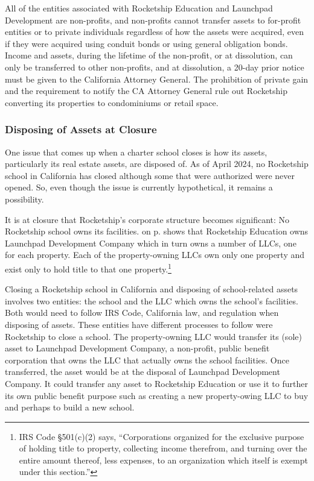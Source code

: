 All of the entities associated with Rocketship Education and Launchpad Development are non-profits, and non-profits cannot transfer assets to for-profit entities or to private individuals regardless of how the assets were acquired, even if they were acquired using conduit bonds or using general obligation bonds. Income and assets, during the lifetime of the non-profit, or at dissolution, can only be transferred to other non-profits, and at dissolution, a 20-day prior notice must be given to the California Attorney General. The prohibition of private gain and the requirement to notify the CA Attorney General rule out Rocketship converting its properties to condominiums or retail space.

\subsubsection{Disposing of Assets at Closure}%
\label{sec:disposal-assets-closure}\indent

One issue that comes up when a charter school closes is how its assets, particularly its real estate assets, are disposed of. As of April 2024, no Rocketship school in California has closed although some that were authorized were never opened. So, even though the issue is currently hypothetical, it remains a possibility.

It is at closure that Rocketship's corporate structure becomes significant: No Rocketship school owns its facilities.  on p.\pageref{fig:corporate-structure} shows that Rocketship Education owns Launchpad Development Company which in turn owns a number of LLCs, one for each property. Each of the property-owning LLCs own only one property and exist only to hold title to that one property.\footnote{IRS Code §501(c)(2) says, ``Corporations organized for the exclusive purpose of holding title to property, collecting income therefrom, and turning over the entire amount thereof, less expenses, to an organization which itself is exempt under this section.''}

Closing a Rocketship school in California and disposing of school-related assets involves two entities: the school and the LLC which owns the school's facilities. Both would need to follow IRS Code, California law, and regulation when disposing of assets. These entities have different processes to follow were Rocketship to close a school. The property-owning LLC would transfer its (sole) asset to Launchpad Development Company, a non-profit, public benefit corporation that owns the LLC that actually owns the school facilities. Once transferred, the asset would be at the disposal of Launchpad Development Company. It could transfer any asset to Rocketship Education or use it to further its own public benefit purpose such as creating a new property-owing LLC to buy and perhaps to build a new school.

